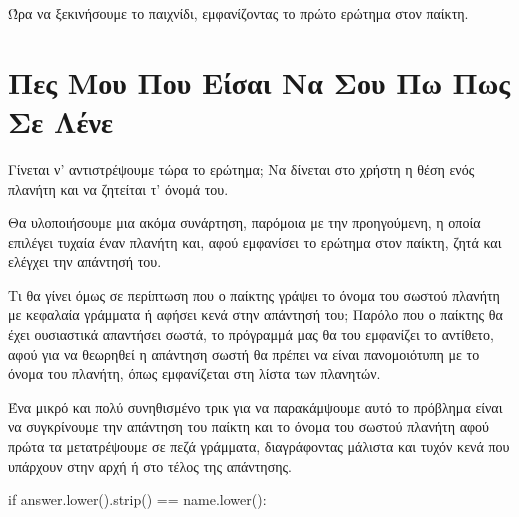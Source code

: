\documentclass[a4paper,11pt,oneside]{book}
\begin{document}
Ώρα να ξεκινήσουμε το παιχνίδι, εμφανίζοντας το πρώτο ερώτημα στον παίκτη.


\section{Πες Μου Που Είσαι Να Σου Πω Πως Σε Λένε}

\begin{question}
Γίνεται ν' αντιστρέψουμε τώρα το ερώτημα; Να δίνεται στο χρήστη η θέση ενός πλανήτη και να ζητείται τ' όνομά του.
\end{question}

Θα υλοποιήσουμε μια ακόμα συνάρτηση, παρόμοια με την προηγούμενη, η οποία επιλέγει τυχαία έναν πλανήτη %
και, αφού εμφανίσει το ερώτημα στον παίκτη, ζητά και ελέγχει την απάντησή του.



Τι θα γίνει όμως σε περίπτωση που ο παίκτης γράψει το όνομα του σωστού πλανήτη με κεφαλαία γράμματα ή αφήσει κενά στην απάντησή του; Παρόλο που ο παίκτης θα έχει ουσιαστικά απαντήσει σωστά, το πρόγραμμά μας θα του εμφανίζει το αντίθετο, αφού για να θεωρηθεί η απάντηση σωστή θα πρέπει να είναι πανομοιότυπη με το όνομα του πλανήτη, όπως εμφανίζεται στη λίστα των πλανητών.

Ένα μικρό και πολύ συνηθισμένο τρικ για να παρακάμψουμε αυτό το πρόβλημα είναι να συγκρίνουμε την απάντηση του παίκτη και το όνομα του σωστού πλανήτη αφού πρώτα τα μετατρέψουμε σε πεζά γράμματα, διαγράφοντας μάλιστα και τυχόν κενά που υπάρχουν στην αρχή ή στο τέλος της απάντησης.

\begin{pycode}
    if answer.lower().strip() == name.lower():
\end{pycode}
\end{document}

